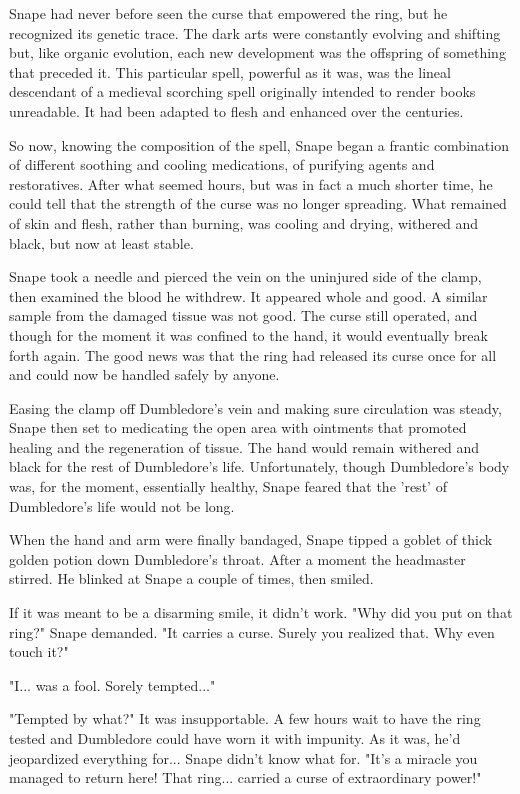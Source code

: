 \documentclass[a4paper,11pt]{article}
\begin{document}
Snape had never before seen the curse that empowered the ring, but he recognized its genetic trace. The dark arts were constantly evolving and shifting but, like organic evolution, each new development was the offspring of something that preceded it. This particular spell, powerful as it was, was the lineal descendant of a medieval scorching spell originally intended to render books unreadable. It had been adapted to flesh and enhanced over the centuries.

So now, knowing the composition of the spell, Snape began a frantic combination of different soothing and cooling medications, of purifying agents and restoratives. After what seemed hours, but was in fact a much shorter time, he could tell that the strength of the curse was no longer spreading. What remained of skin and flesh, rather than burning, was cooling and drying, withered and black, but now at least stable.

Snape took a needle and pierced the vein on the uninjured side of the clamp, then examined the blood he withdrew. It appeared whole and good. A similar sample from the damaged tissue was not good. The curse still operated, and though for the moment it was confined to the hand, it would eventually break forth again. The good news was that the ring had released its curse once for all and could now be handled safely by anyone.

Easing the clamp off Dumbledore's vein and making sure circulation was steady, Snape then set to medicating the open area with ointments that promoted healing and the regeneration of tissue. The hand would remain withered and black for the rest of Dumbledore's life. Unfortunately, though Dumbledore's body was, for the moment, essentially healthy, Snape feared that the 'rest' of Dumbledore's life would not be long.

When the hand and arm were finally bandaged, Snape tipped a goblet of thick golden potion down Dumbledore's throat. After a moment the headmaster stirred. He blinked at Snape a couple of times, then smiled.

If it was meant to be a disarming smile, it didn't work. "Why did you put on that ring?" Snape demanded. "It carries a curse. Surely you realized that. Why even touch it?"

"I... was a fool. Sorely tempted..."

"Tempted by what?" It was insupportable. A few hours wait to have the ring tested and Dumbledore could have worn it with impunity. As it was, he'd jeopardized everything for... Snape didn't know what for. "It's a miracle you managed to return here! That ring... carried a curse of extraordinary power!"
\end{document}
